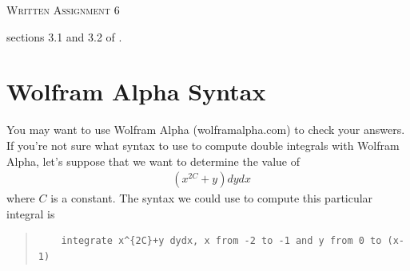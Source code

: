 \documentclass{article}
\title{}
\date{}
\begin{document}
\begin{center}
\textsc{\LARGE Written Assignment 6}\\[0.5cm]
\end{center}
\From sections 3.1 and 3.2 of \VCT.
\section*{Wolfram Alpha Syntax}
You may want to use Wolfram Alpha (wolframalpha.com) to check your answers. If you're not sure what syntax to use to compute double integrals with Wolfram Alpha, let's suppose that we want to determine the value of
\begin{align*} 
   \mathop{\int_{-2}^{-1} \!  \int_0^{x-1}}( x^{2C} +y)  dy  dx
\end{align*}
where $C$ is a constant. The syntax we could use to compute this particular integral is
\begin{quote}
  \begin{verbatim}
    integrate x^{2C}+y dydx, x from -2 to -1 and y from 0 to (x-1)
  \end{verbatim}
\end{quote}
\end{document}
